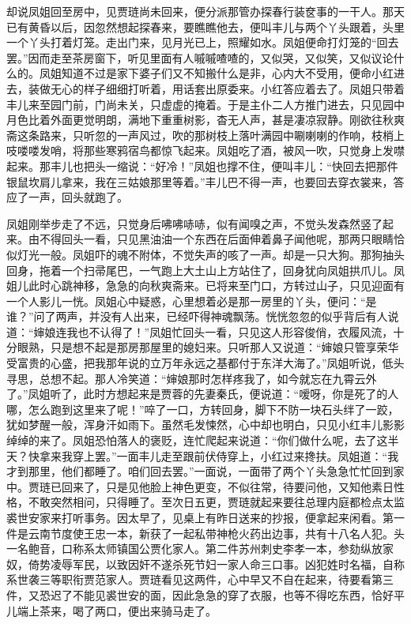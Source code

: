 

\begin{parag}
    却说凤姐回至房中，见贾琏尚未回来，便分派那管办探春行装奁事的一干人。那天已有黄昏以后，因忽然想起探春来，要瞧瞧他去，便叫丰儿与两个丫头跟着，头里一个丫头打着灯笼。走出门来，见月光已上，照耀如水。凤姐便命打灯笼的“回去罢。”因而走至茶房窗下，听见里面有人嘁嘁喳喳的，又似哭，又似笑，又似议论什么的。凤姐知道不过是家下婆子们又不知搬什么是非，心内大不受用，便命小红进去，装做无心的样子细细打听着，用话套出原委来。小红答应着去了。凤姐只带着丰儿来至园门前，门尚未关，只虚虚的掩着。于是主仆二人方推门进去，只见园中月色比着外面更觉明朗，满地下重重树影，杳无人声，甚是凄凉寂静。刚欲往秋爽斋这条路来，只听忽的一声风过，吹的那树枝上落叶满园中唰喇喇的作响，枝梢上吱喽喽发哨，将那些寒鸦宿鸟都惊飞起来。凤姐吃了酒，被风一吹，只觉身上发噤起来。那丰儿也把头一缩说：“好冷！”凤姐也撑不住，便叫丰儿：“快回去把那件银鼠坎肩儿拿来，我在三姑娘那里等着。”丰儿巴不得一声，也要回去穿衣裳来，答应了一声，回头就跑了。
\end{parag}


\begin{parag}
    凤姐刚举步走了不远，只觉身后咈咈哧哧，似有闻嗅之声，不觉头发森然竖了起来。由不得回头一看，只见黑油油一个东西在后面伸着鼻子闻他呢，那两只眼睛恰似灯光一般。凤姐吓的魂不附体，不觉失声的咳了一声。却是一只大狗。那狗抽头回身，拖着一个扫帚尾巴，一气跑上大土山上方站住了，回身犹向凤姐拱爪儿。凤姐儿此时心跳神移，急急的向秋爽斋来。已将来至门口，方转过山子，只见迎面有一个人影儿一恍。凤姐心中疑惑，心里想着必是那一房里的丫头，便问：“是谁？”问了两声，并没有人出来，已经吓得神魂飘荡。恍恍忽忽的似乎背后有人说道：“婶娘连我也不认得了！”凤姐忙回头一看，只见这人形容俊俏，衣履风流，十分眼熟，只是想不起是那房那屋里的媳妇来。只听那人又说道：“婶娘只管享荣华受富贵的心盛，把我那年说的立万年永远之基都付于东洋大海了。”凤姐听说，低头寻思，总想不起。那人冷笑道：“婶娘那时怎样疼我了，如今就忘在九霄云外了。”凤姐听了，此时方想起来是贾蓉的先妻秦氏，便说道：“嗳呀，你是死了的人哪，怎么跑到这里来了呢！”啐了一口，方转回身，脚下不防一块石头绊了一跤，犹如梦醒一般，浑身汗如雨下。虽然毛发悚然，心中却也明白，只见小红丰儿影影绰绰的来了。凤姐恐怕落人的褒贬，连忙爬起来说道：“你们做什么呢，去了这半天？快拿来我穿上罢。”一面丰儿走至跟前伏侍穿上，小红过来搀扶。凤姐道：“我才到那里，他们都睡了。咱们回去罢。”一面说，一面带了两个丫头急急忙忙回到家中。贾琏已回来了，只是见他脸上神色更变，不似往常，待要问他，又知他素日性格，不敢突然相问，只得睡了。至次日五更，贾琏就起来要往总理内庭都检点太监裘世安家来打听事务。因太早了，见桌上有昨日送来的抄报，便拿起来闲看。第一件是云南节度使王忠一本，新获了一起私带神枪火药出边事，共有十八名人犯。头一名鲍音，口称系太师镇国公贾化家人。第二件苏州刺史李孝一本，参劾纵放家奴，倚势凌辱军民，以致因奸不遂杀死节妇一家人命三口事。凶犯姓时名福，自称系世袭三等职衔贾范家人。贾琏看见这两件，心中早又不自在起来，待要看第三件，又恐迟了不能见裘世安的面，因此急急的穿了衣服，也等不得吃东西，恰好平儿端上茶来，喝了两口，便出来骑马走了。
\end{parag}


